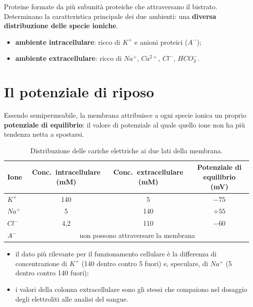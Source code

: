 Proteine formate da più subunità proteiche che attraversano il bistrato. Determinano la
caratteristica principale dei due ambienti: una \textbf{diversa distribuzione delle specie
ioniche}.
\begin{itemize}
  \item \textbf{ambiente intracellulare}: ricco di $K^+$ e anioni proteici ($A^-$);
  \item \textbf{ambiente extracellulare}: ricco di $Na^+$, $Ca^{2+}$, $Cl^-$, $HCO_3^-$.
\end{itemize}

\section{Il potenziale di riposo}

Essendo semipermeabile, la membrana attribuisce a ogni specie ionica un proprio \textbf{potenziale
di equilibrio}: il valore di potenziale al quale quello ione non ha più tendenza netta a spostarsi.

\begin{table}[htbp]
  \centering
  \small
  \renewcommand{\arraystretch}{1.3}
  \begin{tabularx}{\textwidth}{|l|c|c|c|}
    \hline
    \textbf{Ione} & \textbf{Conc.\ intracellulare (mM)} & \textbf{Conc.\ extracellulare (mM)}
      & \textbf{Potenziale di equilibrio (mV)} \\
    \hline
    $K^+$  & 140 & 5   & $-75$ \\
    \hline
    $Na^+$ & 5   & 140 & $+55$ \\
    \hline
    $Cl^-$ & 4,2 & 110 & $-60$ \\
    \hline
    $A^-$  & \multicolumn{3}{c|}{non possono attraversare la membrana} \\
    \hline
  \end{tabularx}
  \caption{Distribuzione delle cariche elettriche ai due lati della membrana.}
  \label{tab:distribuzione-ionica}
\end{table}

\begin{itemize}
  \item il dato più rilevante per il funzionamento cellulare è la differenza di concentrazione di
    $K^+$ (140 dentro contro 5 fuori) e, speculare, di $Na^+$ (5 dentro contro 140 fuori);
  \item i valori della colonna extracellulare sono gli stessi che compaiono nel dosaggio degli
    elettroliti alle analisi del sangue.
\end{itemize}

